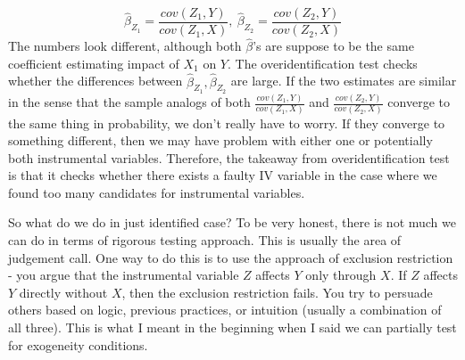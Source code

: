 \documentclass[12pt]{article}
\theoremstyle{definition}
\theoremstyle{property}
\theoremstyle{assumption}
\theoremstyle{example}
\theoremstyle{comment}
\begin{document}
\[
\hat{\beta}_{Z_1}=\frac{cov(Z_1,Y)}{cov(Z_1,X)}, \ \hat{\beta}_{Z_2}=\frac{cov(Z_2,Y)}{cov(Z_2,X)}
\]
The numbers look different, although both $\hat{\beta}$'s are suppose to be the same coefficient estimating impact of $X_1$ on $Y$. The overidentification test checks whether the differences between $\hat{\beta}_{Z_1}, \hat{\beta}_{Z_2}$ are large. If the two estimates are similar in the sense that the sample analogs of both $\frac{cov(Z_1,Y)}{cov(Z_1,X)}$ and $\frac{cov(Z_2,Y)}{cov(Z_2,X)}$ converge to the same thing in probability, we don't really have to worry. If they converge to something different, then we may have problem with either one or potentially both instrumental variables. Therefore, the takeaway from overidentification test is that it checks whether there exists a faulty IV variable in the case where we found too many candidates for instrumental variables. 
\par
So what do we do in just identified case? To be very honest, there is not much we can do in terms of rigorous testing approach. This is usually the area of judgement call. One way to do this is to use the approach of exclusion restriction - you argue that the instrumental variable $Z$ affects $Y$ only through $X$. If $Z$ affects $Y$ directly without $X$, then the exclusion restriction fails. You try to persuade others based on logic, previous practices, or intuition (usually a combination of all three). This is what I meant in the beginning when I said we can partially test for exogeneity conditions. 
\end{document}
